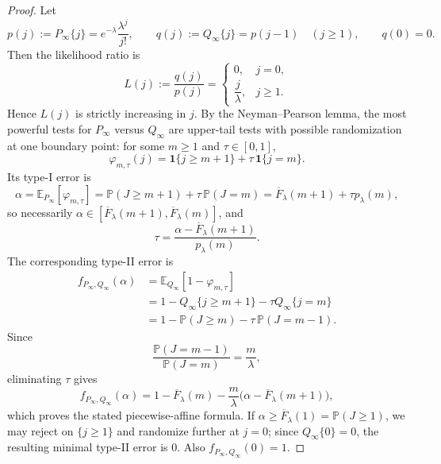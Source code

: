 \documentclass{article}
\begin{document}
\begin{proof}
Let
\[
p(j):=P_\infty\{j\}=e^{-\lambda}\frac{\lambda^j}{j!},
\qquad
q(j):=Q_\infty\{j\}=p(j-1)\quad (j\ge 1),
\qquad q(0)=0.
\]
Then the likelihood ratio is
\[
L(j):=\frac{q(j)}{p(j)}=
\begin{cases}
0, & j=0,\\[2mm]
\dfrac{j}{\lambda}, & j\ge 1.
\end{cases}
\]
Hence $L(j)$ is strictly increasing in $j$. By the Neyman--Pearson lemma, the most powerful tests for
$P_\infty$ versus $Q_\infty$ are upper-tail tests with possible randomization at one boundary point:
for some $m\ge 1$ and $\tau\in[0,1]$,
\[
\varphi_{m,\tau}(j)=\mathbf 1\{j\ge m+1\}+\tau\,\mathbf 1\{j=m\}.
\]
Its type-I error is
\[
\alpha=\mathbb E_{P_\infty}[\varphi_{m,\tau}]
=\mathbb P(J\ge m+1)+\tau\,\mathbb P(J=m)
=\overline F_\lambda(m+1)+\tau p_\lambda(m),
\]
so necessarily $\alpha\in[\overline F_\lambda(m+1),\overline F_\lambda(m)]$, and
\[
\tau=\frac{\alpha-\overline F_\lambda(m+1)}{p_\lambda(m)}.
\]
The corresponding type-II error is
\begin{align*}
f_{P_\infty,Q_\infty}(\alpha)
&=\mathbb E_{Q_\infty}[1-\varphi_{m,\tau}]\\
&=1-Q_\infty\{j\ge m+1\}-\tau Q_\infty\{j=m\}\\
&=1-\mathbb P(J\ge m)-\tau\,\mathbb P(J=m-1).
\end{align*}
Since
\[
\frac{\mathbb P(J=m-1)}{\mathbb P(J=m)}=\frac{m}{\lambda},
\]
eliminating $\tau$ gives
\[
f_{P_\infty,Q_\infty}(\alpha)
=1-\overline F_\lambda(m)-\frac{m}{\lambda}\bigl(\alpha-\overline F_\lambda(m+1)\bigr),
\]
which proves the stated piecewise-affine formula. If $\alpha\ge \overline F_\lambda(1)=\mathbb P(J\ge 1)$,
we may reject on $\{j\ge 1\}$ and randomize further at $j=0$; since $Q_\infty\{0\}=0$, the resulting
minimal type-II error is $0$. Also $f_{P_\infty,Q_\infty}(0)=1$.


\end{proof}
\end{document}
